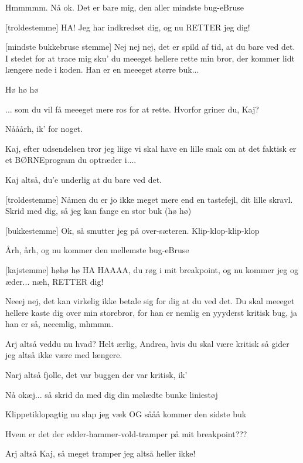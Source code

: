 \documentclass[a4paper,11pt]{article}
\begin{document}
\begin{sketch}
   Hmmmmm. Nå ok.   Det er bare mig, den
  aller mindste bug-eBruse

  [troldestemme] HA! Jeg har indkredset dig, og nu RETTER jeg dig!

   [mindste bukkebruse stemme] Nej nej nej, det er spild af tid, at du
  bare ved det.  I stedet for at trace mig sku' du meeeget hellere rette min
  bror, der kommer lidt længere nede i koden.  Han er en meeeget større buk...

   Hø hø hø

   ... som du vil få meeeget mere ros for at rette.  
  Hvorfor griner du, Kaj?

   Nååårh, ik' for noget.

   Kaj, efter udsendelsen tror jeg liige vi skal have en lille snak om at
  det faktisk er et BØRNEprogram du optræder i....

   Kaj altså, du'e underlig at du bare ved det.

   [troldestemme] Nåmen du er jo ikke meget mere end en tastefejl, dit
  lille skravl. Skrid med dig, så jeg kan fange en stor buk (hø hø)

   [bukkestemme] Ok, så smutter jeg på over-sæteren.  Klip-klop-klip-klop

   Årh, årh, og nu kommer den mellemste bug-eBruse

   [kajstemme] høhø hø  HA HAAAA, du røg i mit
  breakpoint, og nu kommer jeg og æder... næh, RETTER dig!

   Neeej nej, det kan virkelig ikke betale sig for dig at du ved det. Du
  skal meeeget hellere kaste dig over min storebror, for han er nemlig en
  yyyderst kritisk bug, ja han er så, neeemlig, mhmmm.

   Arj altså veddu nu hvad? Helt ærlig, Andrea, hvis du skal være kritisk
  så gider jeg altså ikke være med længere.

   Narj altså fjolle, det var buggen der var kritisk, ik'

   Nå okæj...   så skrid da med dig din mølædte bunke
  liniestøj

   Klippetiklopagtig nu slap jeg væk OG sååå kommer den sidste buk

   Hvem er det der edder-hammer-vold-tramper på mit breakpoint???

   Arj altså Kaj, så meget tramper jeg altså heller ikke!


\end{sketch}
\end{document}
